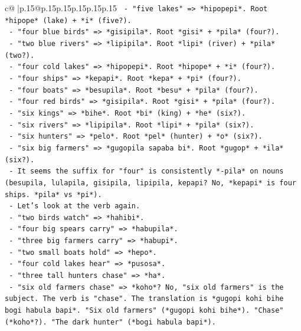 \documentclass{article}
\begin{document}
{\begin{supertabular}{c@{$\;$}|p{.15\linewidth}@{}p{.15\linewidth}p{.15\linewidth}p{.15\linewidth}p{.15\linewidth}p{.15\linewidth}}
{{{\texttt{           {-} "five lakes" => *hipopepi*. Root *hipope* (lake) + *i* (five?).} \\
\texttt{           {-} "four blue birds" => *gisipila*. Root *gisi* + *pila* (four?).} \\
\texttt{           {-} "two blue rivers" => *lipipila*. Root *lipi* (river) + *pila* (two?).} \\
\texttt{           {-} "four cold lakes" => *hipopepi*. Root *hipope* + *i* (four?).} \\
\texttt{           {-} "four ships" => *kepapi*. Root *kepa* + *pi* (four?).} \\
\texttt{           {-} "four boats" => *besupila*. Root *besu* + *pila* (four?).} \\
\texttt{           {-} "four red birds" => *gisipila*. Root *gisi* + *pila* (four?).} \\
\texttt{           {-} "six kings" => *bihe*. Root *bi* (king) + *he* (six?).} \\
\texttt{           {-} "six rivers" => *lipipila*. Root *lipi* + *pila* (six?).} \\
\texttt{           {-} "six hunters" => *pelo*. Root *pel* (hunter) + *o* (six?).} \\
\texttt{           {-} "six big farmers" => *gugopila sapaba bi*. Root *gugop* + *ila* (six?).} \\
\texttt{       {-} It seems the suffix for "four" is consistently *{-}pila* on nouns (besupila, lulapila, gisipila, lipipila, kepapi? No, *kepapi* is four ships. *pila* vs *pi*).} \\
\texttt{       {-} Let's look at the verb again.} \\
\texttt{         {-} "two birds watch" => *hahibi*.} \\
\texttt{         {-} "four big spears carry" => *habupila*.} \\
\texttt{         {-} "three big farmers carry" => *habupi*.} \\
\texttt{         {-} "two small boats hold" => *hepo*.} \\
\texttt{         {-} "four cold lakes hear" => *pusosa*.} \\
\texttt{         {-} "three tall hunters chase" => *ha*.} \\
\texttt{         {-} "six old farmers chase" => *koho*? No, "six old farmers" is the subject. The verb is "chase". The translation is *gugopi kohi bihe bogi habula bapi*. "Six old farmers" (*gugopi kohi bihe*). "Chase" (*koho*?). "The dark hunter" (*bogi habula bapi*).} \\
}}}
\end{supertabular}}
\end{document}
